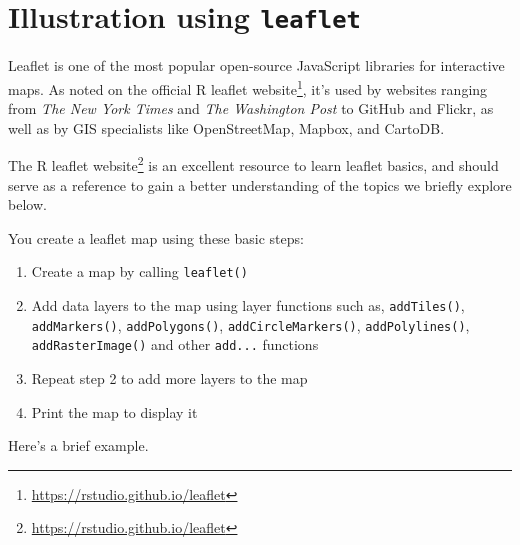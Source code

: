 \documentclass[]{krantz}
\makeatletter
\newenvironment{Shaded}{\begin{snugshade}}{\end{snugshade}}
\newcommand{\CommentTok}[1]{\textcolor[rgb]{0.37,0.37,0.37}{\textit{#1}}}
\newcommand{\DataTypeTok}[1]{\textcolor[rgb]{0.27,0.27,0.27}{#1}}
\newcommand{\ErrorTok}[1]{\textcolor[rgb]{0.14,0.14,0.14}{\textbf{#1}}}
\newcommand{\FloatTok}[1]{\textcolor[rgb]{0.06,0.06,0.06}{#1}}
\newcommand{\KeywordTok}[1]{\textcolor[rgb]{0.27,0.27,0.27}{\textbf{#1}}}
\newcommand{\NormalTok}[1]{#1}
\newcommand{\OperatorTok}[1]{\textcolor[rgb]{0.43,0.43,0.43}{\textbf{#1}}}
\newcommand{\StringTok}[1]{\textcolor[rgb]{0.5,0.5,0.5}{#1}}
\providecommand{\tightlist}{%
  \setlength{\itemsep}{0pt}\setlength{\parskip}{0pt}}
\renewcommand{\href}[2]{#2\footnote{\url{#1}}}
\newenvironment{kframe}{%
\medskip{}
\setlength{\fboxsep}{.8em}
 \def\at@end@of@kframe{}%
 \ifinner\ifhmode%
  \def\at@end@of@kframe{\end{minipage}}%
  \begin{minipage}{\columnwidth}%
 \fi\fi%
 \def\FrameCommand##1{\hskip\@totalleftmargin \hskip-\fboxsep
 \colorbox{shadecolor}{##1}\hskip-\fboxsep
     \hskip-\linewidth \hskip-\@totalleftmargin \hskip\columnwidth}%
 \MakeFramed {\advance\hsize-\width
   \@totalleftmargin\z@ \linewidth\hsize
   \@setminipage}}%
 {\par\unskip\endMakeFramed%
 \at@end@of@kframe}
\renewenvironment{Shaded}{\begin{kframe}}{\end{kframe}}
\makeatother
\begin{document}
\hypertarget{illustration-using-leaflet}{%
\section{\texorpdfstring{Illustration using \texttt{leaflet}}{Illustration using leaflet}}\label{illustration-using-leaflet}}

Leaflet is one of the most popular open-source JavaScript libraries for interactive maps. As noted on the official \href{https://rstudio.github.io/leaflet}{R leaflet website}, it's used by websites ranging from \emph{The New York Times} and \emph{The Washington Post} to GitHub and Flickr, as well as by GIS specialists like OpenStreetMap, Mapbox, and CartoDB.

The \href{https://rstudio.github.io/leaflet}{R leaflet website} is an excellent resource to learn leaflet basics, and should serve as a reference to gain a better understanding of the topics we briefly explore below.

You create a leaflet map using these basic steps:

\begin{enumerate}
\def\labelenumi{\arabic{enumi}.}
\tightlist
\item
  Create a map by calling \texttt{leaflet()}
\item
  Add data layers to the map using layer functions such as, \texttt{addTiles()}, \texttt{addMarkers()}, \texttt{addPolygons()}, \texttt{addCircleMarkers()}, \texttt{addPolylines()}, \texttt{addRasterImage()} and other \texttt{add...} functions
\item
  Repeat step 2 to add more layers to the map
\item
  Print the map to display it
\end{enumerate}

Here's a brief example.

\begin{Shaded}
\end{Shaded}
\end{document}
